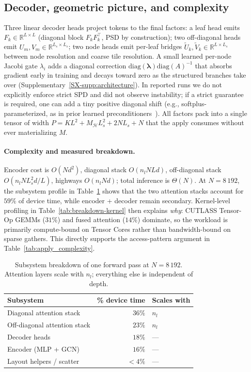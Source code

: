 \documentclass[acmtog,anonymous,review]{acmart}
\theoremstyle{plain}
\begin{document}
\subsection{Decoder, geometric picture, and complexity}
\label{sec:method:decoder}
Three linear decoder heads project tokens to the final factors: a leaf head emits
$F_k\!\in\!\mathbb{R}^{L\times L}$ (diagonal block $F_kF_k^\top$, PSD by construction);
two off-diagonal heads emit $U_m, V_m\!\in\!\mathbb{R}^{L_s\times L_s}$; two node heads
emit per-leaf bridges $\tilde U_k, \tilde V_k\!\in\!\mathbb{R}^{L\times L_s}$ between
node resolution and coarse tile resolution. A small learned per-node Jacobi gate
$\lambda_i$ adds a diagonal correction $\mathrm{diag}(\boldsymbol\lambda)\mathrm{diag}(A)^{-1}$
that absorbs gradient early in training and decays toward zero as the structured
branches take over (Supplementary~\ref{SX-supp:architecture}). In reported runs we do
not explicitly enforce strict SPD and did not observe instability; if a strict guarantee
is required, one can add a tiny positive diagonal shift (e.g., softplus-parameterized,
as in prior learned preconditioners~\cite{Yang2025sparse}). All factors pack into a
single tensor of width $P\!=\!KL^2+M_{\mathcal{H}}L_s^2+2NL_s+N$ that the apply consumes
without ever materializing $M$.

\paragraph{Complexity and measured breakdown.}
Encoder cost is $O(Nd^2)$, diagonal stack $O(n_lNLd)$, off-diagonal stack
$O(n_lNL_s^2d/L)$, highways $O(n_lNd)$; total inference is $\Theta(N)$. At
$N\!=\!8\,192$, the subsystem profile in Table~\ref{tab:breakdown-subsystem} shows that
the two attention stacks account for $59\%$ of device time, while encoder + decoder remain
secondary. Kernel-level profiling in Table~\ref{tab:breakdown-kernel} then explains
\emph{why}: CUTLASS Tensor-Op GEMMs ($31\%$) and fused attention ($14\%$) dominate, so the
workload is primarily compute-bound on Tensor Cores rather than bandwidth-bound on sparse
gathers. This directly supports the access-pattern argument in
Table~\ref{tab:apply_complexity}.

\begin{table}[t]
\centering
\caption{Subsystem breakdown of one forward pass at $N\!=\!8\,192$. Attention layers
scale with $n_l$; everything else is independent of depth.}
\label{tab:breakdown-subsystem}
\footnotesize\setlength{\tabcolsep}{4pt}
\begin{tabular}{@{}lrl@{}}
\toprule
Subsystem & \% device time & Scales with \\
\midrule
Diagonal attention stack     & $36\%$ & $n_l$ \\
Off-diagonal attention stack & $23\%$ & $n_l$ \\
Decoder heads                & $18\%$ & --- \\
Encoder (MLP + GCN)          & $16\%$ & --- \\
Layout helpers / scatter     & $<\!4\%$ & --- \\
\bottomrule
\end{tabular}
\end{table}
\end{document}
